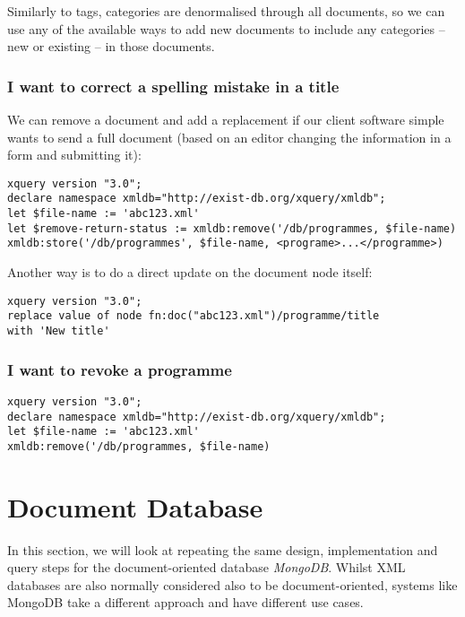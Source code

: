 \documentclass[11pt,a4paper]{article}
\begin{document}
Similarly to tags, categories are denormalised through all documents, so
we can use any of the available ways to add new documents to include
any categories -- new or existing -- in those documents.

\subsubsection{I want to correct a spelling mistake in a title}

We can remove a document and add a replacement if our client
software simple wants to send a full document (based on an editor
changing the information in a form and submitting it):

\begin{lstlisting}
xquery version "3.0";
declare namespace xmldb="http://exist-db.org/xquery/xmldb";
let $file-name := 'abc123.xml'
let $remove-return-status := xmldb:remove('/db/programmes, $file-name)
xmldb:store('/db/programmes', $file-name, <programe>...</programme>)
\end{lstlisting}

Another way is to do a direct update on the document node itself:

\begin{lstlisting}
xquery version "3.0";
replace value of node fn:doc("abc123.xml")/programme/title
with 'New title'
\end{lstlisting}

\subsubsection{I want to revoke a programme}

\begin{lstlisting}
xquery version "3.0";
declare namespace xmldb="http://exist-db.org/xquery/xmldb";
let $file-name := 'abc123.xml'
xmldb:remove('/db/programmes, $file-name)
\end{lstlisting}


\section{Document Database}

In this section, we will look at repeating the same design, implementation
and query steps for the document-oriented database \emph{MongoDB}. Whilst
XML databases are also normally considered also to be document-oriented,
systems like MongoDB take a different approach and have different use
cases.
\end{document}
